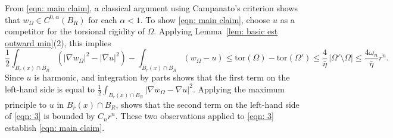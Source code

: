 \documentclass[10pt, reqno]{amsart}
\numberwithin{equation}{section}
\def\W{\Omega}
\def\om{\omega}
\def\tor{\mathrm{tor}}
\def\na{\nabla}
\begin{document}
From \eqref{eqn: main claim}, a classical argument using Campanato's criterion shows that $w_\W \in C^{0,\alpha}(B_R)$ for each $\alpha<1$.
To show \eqref{eqn: main claim}, choose $u$ as a competitor for the torsional rigidity of $\W$. Applying Lemma~\ref{lem: basic est outward min}(2), this implies 
\begin{equation}\label{eqn: 3}
\frac{1}{2}\int_{B_r(x) \cap B_R} (|\nabla w_\W|^2 - |\nabla u|^2) - \int_{B_r(x) \cap B_R}  (w_\W - u) \leq \tor(\W) - \tor (\W') \leq \frac{4}{\bar\eta} \, |\W'\setminus\W | \leq \frac{4\om_n}{\bar\eta} r^n.
\end{equation}
Since $u$ is harmonic, and integration by parts shows that the first term on the left-hand side is equal to $\frac{1}{2} \int_{B_r(x) \cap B_R}  |\nabla w_\W - \na u|^2$. Applying the maximum principle to $u$ in $B_r(x) \cap B_R$, shows that the second term on the left-hand side of \eqref{eqn: 3} is bounded by $C_n r^n$. These two observations applied to 
\eqref{eqn: 3} establish \eqref{eqn: main claim}.
\end{document}
